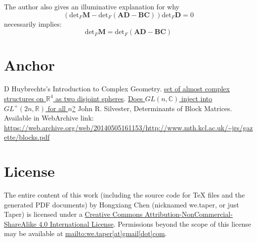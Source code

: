 \documentclass{article}
\numberwithin{equation}{subsection} %
\theoremstyle{definition}
\begin{document}
        The author also gives an illuminative explanation for why
        $$ \left( \text{det}_F \mathbf{M}- \text{det}_F (\mathbf{AD-BC}) 
            \right) \text{det}_F \mathbf{D} =0 $$
        necessarily implies:
        $$ \text{det}_F \mathbf{M}= \text{det}_F (\mathbf{AD-BC}) $$
       

\section{Anchor}
\label{sec:Anchor}

\begin{thebibliography}{1}
   D Huybrechts's Introduction to Complex Geometry.
   \href{http://math.stackexchange.com/questions/923957/set-of-almost-complex-structures-on-mathbb-r4-as-two-disjoint-spheres}{set of almost complex structures on $\mathbb{R}^4$ as two disjoint spheres}.
   \href{http://math.stackexchange.com/questions/1356823/does-gln-mathbbc-inject-into-gl2n-mathbbr-for-all-n}{Does $GL(n,\mathbb{C})$ inject into $GL^+(2n, \mathbb{R})$ for all $n$?}
   John R. Silvester, 
      Determinants of Block Matrices. Available in WebArchive link:
      \url{https://web.archive.org/web/20140505161153/http://www.mth.kcl.ac.uk/~jrs/gazette/blocks.pdf}
\end{thebibliography}
\printnomenclature


\section{License}
The entire content of this work (including the source code
for TeX files and the generated PDF documents) by 
Hongxiang Chen (nicknamed we.taper, or just Taper) is
licensed under a 
\href{http://creativecommons.org/licenses/by-nc-sa/4.0/}{Creative 
Commons Attribution-NonCommercial-ShareAlike 4.0 International 
License}. Permissions beyond the scope of this 
license may be available at \url{mailto:we.taper[at]gmail[dot]com}.
\end{document}
